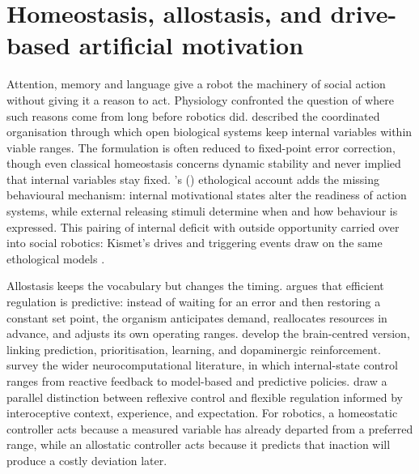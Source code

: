 \section{Homeostasis, allostasis, and drive-based artificial motivation}
\label{sec:soa-homeostasis}

Attention, memory and language give a robot the machinery of social action without giving it a reason to act. Physiology confronted the question of where such reasons come from long before robotics did. \citet{Cannon1929Homeostasis} described the coordinated organisation through which open biological systems keep internal variables within viable ranges. The formulation is often reduced to fixed-point error correction, though even classical homeostasis concerns dynamic stability and never implied that internal variables stay fixed. \citeauthor{Tinbergen1951Instinct}'s (\citeyear{Tinbergen1951Instinct}) ethological account adds the missing behavioural mechanism: internal motivational states alter the readiness of action systems, while external releasing stimuli determine when and how behaviour is expressed. This pairing of internal deficit with outside opportunity carried over into social robotics: Kismet's drives and triggering events draw on the same ethological models \citep{Breazeal2003Emotion}.

Allostasis keeps the vocabulary but changes the timing. \citet{Sterling2012Allostasis} argues that efficient regulation is predictive: instead of waiting for an error and then restoring a constant set point, the organism anticipates demand, reallocates resources in advance, and adjusts its own operating ranges. \citet{SchulkinSterling2019Allostasis} develop the brain-centred version, linking prediction, prioritisation, learning, and dopaminergic reinforcement. \citet{Hulme2019HomeostaticControl} survey the wider neurocomputational literature, in which internal-state control ranges from reactive feedback to model-based and predictive policies. \citet{Petzschner2021Interoception} draw a parallel distinction between reflexive control and flexible regulation informed by interoceptive context, experience, and expectation. For robotics, a homeostatic controller acts because a measured variable has already departed from a preferred range, while an allostatic controller acts because it predicts that inaction will produce a costly deviation later.

